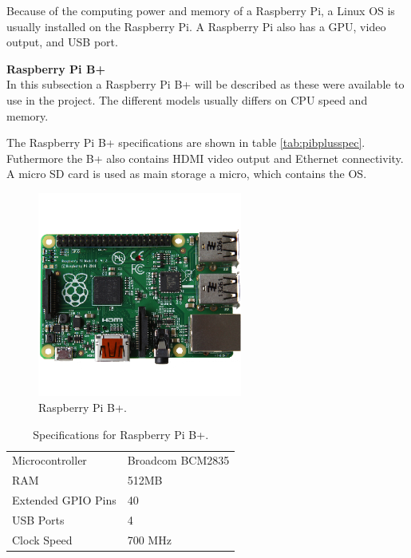 Because of the computing power and memory of a Raspberry Pi, a Linux OS is usually installed on the Raspberry Pi\cite{Arduino_linux}. A Raspberry Pi also has a GPU, video output, and USB port.

\textbf{Raspberry Pi B+}\\
In this subsection a Raspberry Pi B+ will be described as these were available to use in the project. The different models usually differs on CPU speed and memory.

The Raspberry Pi B+ specifications are shown in table \ref{tab:pibplusspec}. Futhermore the B+ also contains HDMI video output and Ethernet connectivity. A micro SD card is used as main storage a micro, which contains the OS.

\begin{figure}[H]
\centering
\includegraphics[width=0.6\textwidth]{chapters/analysis/figs/raspberry-pi-model-b-plus.png}
\caption{Raspberry Pi B+\cite{pibplus}.}
\label{fig:pibplus}
\end{figure}

\begin{table}[H]
\centering
\begin{tabular}{| l | l |}
\hline
Microcontroller & Broadcom BCM2835\\
RAM & 512MB\\
Extended GPIO Pins & 40\\
USB Ports & 4\\
Clock Speed & 700 MHz\\
\hline
\end{tabular}
\caption{Specifications for Raspberry Pi B+\cite{pispecs}.}
\end{table}
\label{tab:pibplusspec}
